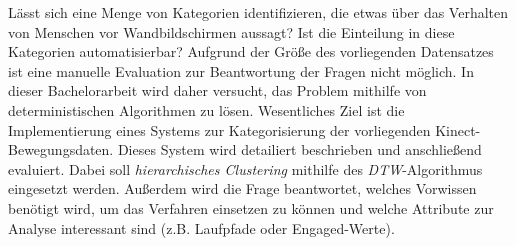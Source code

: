 Lässt sich eine Menge von Kategorien identifizieren, die etwas über das Verhalten von Menschen vor Wandbildschirmen aussagt?
Ist die Einteilung in diese Kategorien automatisierbar?
Aufgrund der Größe des vorliegenden Datensatzes ist eine manuelle Evaluation zur Beantwortung der Fragen nicht möglich.
In dieser Bachelorarbeit wird daher versucht, das Problem mithilfe von deterministischen Algorithmen zu lösen.
Wesentliches Ziel ist die Implementierung eines Systems zur Kategorisierung der vorliegenden Kinect-Bewegungsdaten.
Dieses System wird detailiert beschrieben und anschließend evaluiert.
Dabei soll \emph{hierarchisches Clustering} mithilfe des \emph{\ac{DTW}}-Algorithmus eingesetzt werden.
Außerdem wird die Frage beantwortet, welches Vorwissen benötigt wird,
um das Verfahren einsetzen zu können und welche Attribute zur Analyse interessant sind (z.B. Laufpfade oder Engaged-Werte).